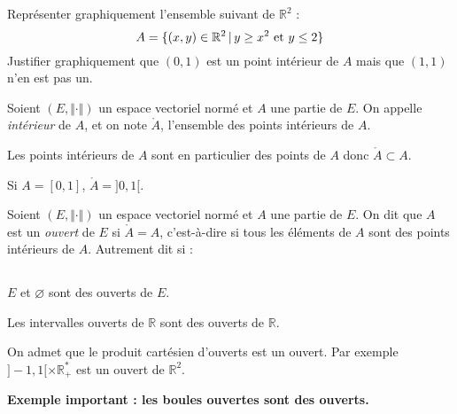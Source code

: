 \documentclass[a4paper,10pt]{report}
\begin{document}
\begin{ApplicationDirecte} Représenter graphiquement l'ensemble suivant de $\mathbb{R}^2$ :
$$ A= \lbrace (x,y) \in \mathbb{R}^2 \, \vert \,  y \geq x^2 \hbox{ et } y \leq 2 \rbrace$$
Justifier graphiquement que $(0,1)$ est un point intérieur de $A$ mais que $(1,1)$ n'en est pas un.
\end{ApplicationDirecte}

\begin{Definition}{} Soient $(E, \Vert \cdot \Vert)$ un espace vectoriel normé et $A$ une partie de $E$. On appelle \emph{intérieur} de $A$, et on note $\mathring{A}$, l'ensemble des points intérieurs de $A$.
\end{Definition}

\begin{Remarque}{} Les points intérieurs de $A$ sont en particulier des points de $A$ donc $\mathring{A} \subset A$.
\end{Remarque}

\begin{Exemple} Si $A=[0,1]$, $\mathring{A} = ]0,1[$.
\end{Exemple}

\begin{Definition}{}
Soient $(E, \Vert \cdot \Vert)$ un espace vectoriel normé et $A$ une partie de $E$. On dit que $A$ est un \emph{ouvert} de $E$ si $\mathring{A}=A$, c'est-à-dire si tous les éléments de $A$ sont des points intérieurs de $A$. Autrement dit si :
$$ \phantom{\forall a \in A, \, \exists r>0 \, \vert \, B(a,r) \subset A}$$
\end{Definition}
%

\begin{exems}
\item $E$ et $\varnothing$ sont des ouverts de $E$.
\item Les intervalles ouverts de $\mathbb{R}$ sont des ouverts de $\mathbb{R}$.
\item On admet que le produit cartésien d'ouverts est un ouvert. Par exemple $]-1,1[ \times \mathbb{R}_{+}^*$ est un ouvert de $\mathbb{R}^2$.
\end{exems}

\medskip

\textbf{Exemple important : les boules ouvertes sont des ouverts.}
\end{document}
